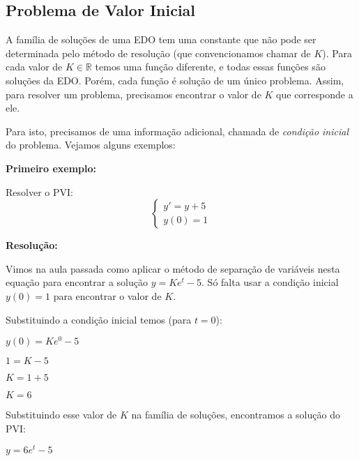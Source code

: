 \documentclass[a4paper]{article}
\begin{document}
\subsection{Problema de Valor Inicial}

A família de soluções de uma EDO tem uma constante que não pode ser
determinada pelo método de resolução (que convencionamos chamar de
$K$). Para cada valor de $K\in \mathbb{R}$ temos uma função diferente,
e todas essas funções são soluções da EDO. Porém, cada função é
solução de um único problema. Assim, para resolver um problema,
precisamos encontrar o valor de $K$ que corresponde a ele.

Para isto, precisamos de uma informação adicional, chamada de {\em
  condição inicial} do problema. Vejamos alguns exemplos:

{\bf Primeiro exemplo:}

\begin{multicols}{2}
  Resolver o PVI:
    \begin{displaymath}
    \left\{
      \begin{array}{l}
        y'=y+5\\
        y(0)=1
      \end{array}
    \right.
  \end{displaymath}

{\bf Resolução:}

Vimos na aula passada como aplicar o método de separação de variáveis
nesta equação para encontrar a solução $y = Ke^t -5$. Só falta usar a
condição inicial $y(0) = 1$ para encontrar o valor de $K$.

Substituindo a condição inicial temos (para $t=0$):

$y(0) = Ke^{0}-5$

$1 = K - 5$

$K = 1+5$

$K=6$

Substituindo esse valor de $K$ na família de soluções, encontramos a
solução do PVI:

$y = 6e^t-5$
\end{multicols}
\end{document}
